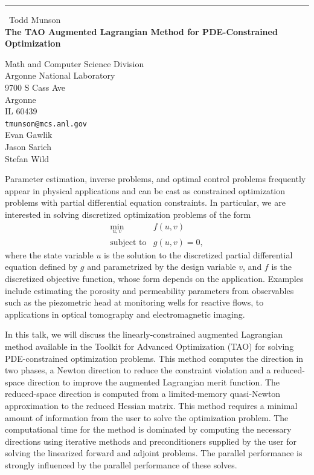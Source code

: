 \documentclass{report}
\begin{document}
\begin{center}
\rule{6in}{1pt} \
{\large Todd Munson \\
{\bf The TAO Augmented Lagrangian Method for PDE-Constrained Optimization}}

Math and Computer Science Division \\ Argonne National Laboratory \\ 9700 S Cass Ave \\ Argonne \\ IL 60439
\\
{\tt tmunson@mcs.anl.gov}\\
Evan Gawlik\\
Jason Sarich\\
Stefan Wild\end{center}

Parameter estimation, inverse problems, and optimal control problems
frequently appear in physical applications and can be cast
as constrained optimization problems with partial differential equation
constraints. In particular, we are interested in solving
discretized optimization problems of the form
\[
\begin{array}{ll}
\displaystyle \min_{u,v} & f(u,v) \\
\mbox{subject to} & g(u,v) = 0,
\end{array}
\]
where the state variable $u$ is the solution to the discretized partial
differential equation defined by $g$ and parametrized by the design
variable $v$, and $f$ is the discretized objective function, whose
form depends on the application. Examples include estimating the
porosity and permeability parameters from observables such as the
piezometric head at monitoring wells for reactive flows,
to applications in optical tomography and electromagnetic imaging.

In this talk, we will discuss the linearly-constrained augmented
Lagrangian method available in the Toolkit for Advanced Optimization (TAO)
for solving PDE-constrained optimization problems. This method computes
the direction in two phases, a Newton direction to reduce the constraint violation
and a reduced-space direction to improve the augmented Lagrangian merit
function. The reduced-space direction is computed from a limited-memory
quasi-Newton approximation to the reduced Hessian matrix. This method
requires a minimal amount of information from the user to solve the
optimization problem. The computational time for the method is dominated
by computing the necessary directions using iterative methods and
preconditioners supplied by the user for solving the linearized forward
and adjoint problems. The parallel performance is strongly influenced
by the parallel performance of these solves.
\end{document}
